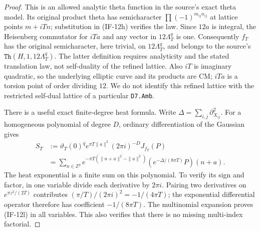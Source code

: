 \documentclass[11pt,a4paper]{article}
\theoremstyle{definition}
\theoremstyle{remark}
\begin{document}
\begin{proof}
This is an allowed analytic theta function in the source's exact
theta model. Its original product theta has semicharacter
$\prod(-1)^{m_{ij}n_{ij}}$ at lattice points $m+iTn$; substitution
in (IF-12h) verifies the law. Since $12a$ is integral, the Heisenberg
commutator for $iTa$ and any vector in $12\Lambda_T^q$ is one.
Consequently $f_T$ has the original semicharacter, here trivial,
on $12\Lambda_T^q$, and belongs to the source's
$\texttt{Th}(H,1,12\Lambda_T^q)$. The latter definition requires
analyticity and the stated translation law, not self-duality of the
refined lattice. Also $iT$ is imaginary quadratic, so the underlying
elliptic curve and its products are CM; $iTa$ is a torsion point of
order dividing $12$. We do not identify this refined lattice with
the restricted self-dual lattice of a particular \texttt{D7.Amb}.

There is a useful exact finite-degree heat formula. Write
$\Delta=\sum_{i,j}\partial_{X_{ij}}^2$. For a homogeneous polynomial
of degree $D$, ordinary differentiation of the Gaussian gives
\[
 \begin{split}
 S_T&:=\vartheta_T(0)^q e^{\pi T\|a\|^2}(2\pi i)^{-D}
                                                    J_{f_T}(P)\\
 &=\sum_{n\in\mathbb Z^q}
    e^{-\pi T(\|n+a\|^2-\|a\|^2)}
       \left(e^{-\Delta/(8\pi T)}P\right)(n+a).
 \end{split}                                                  \tag{IF-12l}
\]
The heat exponential is a finite sum on this polynomial. To verify
its sign and factor, in one variable divide each derivative by
$2\pi i$. Pairing two derivatives on
$e^{\pi z^2/(2T)}$ contributes
$(\pi/T)/(2\pi i)^2=-1/(4\pi T)$; the exponential differential
operator therefore has coefficient $-1/(8\pi T)$. The multinomial
expansion proves (IF-12l) in all variables. This also verifies that
there is no missing multi-index factorial.


\end{proof}
\end{document}
